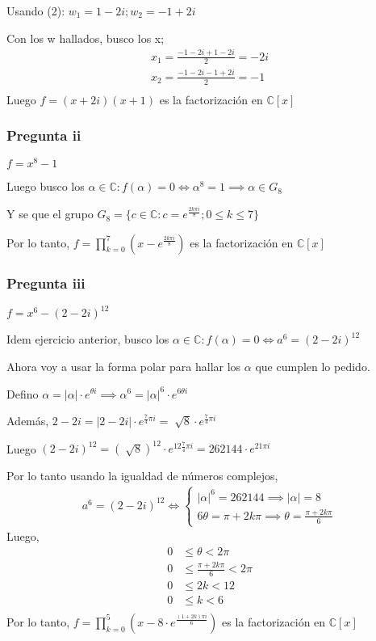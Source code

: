 Usando (2): $ w_1 = 1-2i; w_2 = -1+2i $

Con los w hallados, busco los x;
\begin{align*}
    x_1 = \frac{-1-2i + 1 - 2i}{2} = -2i \\
    x_2 = \frac{-1-2i - 1 + 2i}{2} = -1 \\
\end{align*}
Luego $ f = (x+2i)(x+1) $ es la factorización en $ \mathbb{C}[x] $

\subsubsection{Pregunta ii}
$ f = x^8 - 1 $

Luego busco los $ \alpha \in \mathbb{C}: f(\alpha) = 0 \iff \alpha^8 = 1 \implies \alpha \in G_8 $

Y se que el grupo $ G_8 = \{ c \in \mathbb{C}: c = e^{\frac{2k\pi i}{8}}; 0 \leq k \leq 7 \} $

Por lo tanto, $ f = \prod_{k = 0}^{7}(x-e^{\frac{2k \pi i}{8}}) $ es la factorización en $ \mathbb{C}[x] $

\subsubsection{Pregunta iii}
$ f = x^6 - (2-2i)^{12} $

Idem ejercicio anterior, busco los $ \alpha \in \mathbb{C}: f(\alpha) = 0 \iff a^6 = (2-2i)^{12} $

Ahora voy a usar la forma polar para hallar los $ \alpha $ que cumplen lo pedido.

Defino $ \alpha = |\alpha| \cdot e^{\theta i} \implies \alpha^6 = |\alpha|^6 \cdot e^{6\theta i} $

Además, $ 2-2i = |2-2i| \cdot e^{\frac{7}{4}\pi i} = \sqrt[]{8} \cdot e^{\frac{7}{4}\pi i} $

Luego $ (2-2i)^{12} = (\sqrt[]{8})^{12} \cdot e^{12\frac{7}{4}\pi i} = 262144 \cdot e^{21\pi i} $

Por lo tanto usando la igualdad de números complejos,
\begin{align*}
    a^6 = (2-2i)^{12} \iff \begin{cases}
        |\alpha|^6 = 262144 \implies |\alpha| = 8 \\
        6\theta = \pi + 2k \pi \implies \theta = \frac{\pi +2k \pi}{6}
    \end{cases}
\end{align*}
Luego,
\begin{align*}
    0 &\leq \theta < 2\pi \\
    0 &\leq \frac{\pi +2k \pi}{6} < 2\pi \\
    0 &\leq 2k < 12 \\
    0 &\leq k < 6 \\
\end{align*}
Por lo tanto,
$ f = \prod_{k = 0}^{5}(x-8\cdot e^{\frac{(1+2k)\pi i}{6}}) $ es la factorización en $ \mathbb{C}[x] $

